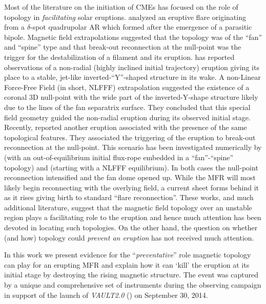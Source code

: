\documentclass[preprint]{aastex}
\begin{document}
Most of the literature on the initiation of CMEs has focused on the role of topology in \emph{facilitating} solar eruptions. \citet{Aulanier_etal_2000} analyzed an eruptive flare originating from a $\delta$-spot quadrupolar AR which formed after the emergence of a parasitic bipole. Magnetic field extrapolations suggested that the topology was of the ``fan'' and ``spine'' type and that break-out reconnection \citep{Antiochos_etal_1999} at the null-point was the trigger for the destabilization of a filament and its eruption. \citet{Sun_etal_2012b} has reported observations of a non-radial (highly inclined initial trajectory) eruption giving its place to a stable, jet-like inverted-``Y''-shaped structure in its wake. A non-Linear Force-Free Field (in short, NLFFF) extrapolation suggested the existence of a coronal 3D null-point with the wide part of the inverted-Y-shape structure likely due to the lines of the fan separatrix surface. They concluded that this special field geometry guided the non-radial eruption during its observed initial stage. Recently, \citet{Sun_etal_2013} reported another eruption associated with the presence of the same topological features. They associated the triggering of the eruption to break-out reconnection at the null-point. This scenario has been investigated numerically by \citet{Lugaz_etal_2011} (with an out-of-equilibrium initial flux-rope embedded in a ``fan''-``spine'' topology) and \citet{Jiang_etal_2013} (starting with a NLFFF equilibrium). In both cases the null-point reconnection intensified and the fan dome opened up. While the MFR will most likely begin reconnecting with the overlying field, a current sheet forms behind it as it rises giving birth to standard ``flare reconnection''. These works, and much additional literature, suggest that the magnetic field topology over an unstable region plays a facilitating role to the eruption and hence much attention has been devoted in locating such topologies. On the other hand, the question on whether (and how) topology could \emph{prevent an eruption} has not received much attention. 


In this work we present evidence for the ``\emph{preventative}'' role  magnetic topology can play for an erupting MFR and explain how it can `kill' the eruption at its initial stage by destroying the rising magnetic structure. The event was captured by a unique and comprehensive set of instruments during the observing campaign in support of the launch of \emph{VAULT2.0} (\citealt{Vourlidas_etal_2016}) on September 30, 2014. 
\end{document}
